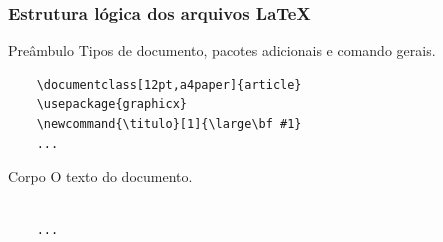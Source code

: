 \begin{frame}[fragile]
\frametitle{Estrutura lógica dos arquivos \LaTeX}
{\small
\begin{block}{Preâmbulo}
Tipos de documento, pacotes adicionais e comando gerais. 
\begin{verbatim}
	\documentclass[12pt,a4paper]{article}
	\usepackage{graphicx}
	\newcommand{\titulo}[1]{\large\bf #1}
	...
\end{verbatim}
\end{block}

\begin{block}{Corpo}
O texto do documento.
\begin{verbatim}
	
 	...
	
\end{verbatim}
\end{block}
}
 
\end{frame}


